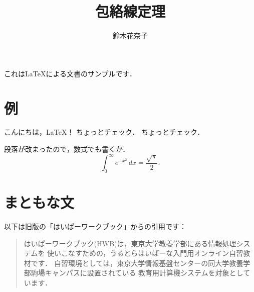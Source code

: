 \documentclass[b5paper]{jsarticle}
\title{包絡線定理}
\author{鈴木花奈子}
\begin{document}
\maketitle
これは\LaTeX による文書のサンプルです．

\section{例}
こんにちは，\LaTeX！
ちょっとチェック．
ちょ{}っとチェ{}ック．

段落が改まったので，数式でも書くか．
\[
  \int_0^{\infty} e^{-x^2}\,dx=\frac{\sqrt{\pi}}{2}.
\]

\section{まともな文}
以下は旧版の「はいぱーワークブック」からの引用です：
\begin{quote}
  はいぱーワークブック(HWB)は，東京大学教養学部にある情報処理システムを
  使いこなすための，うるとらはいぱーな入門用オンライン自習教材です．
  自習環境としては，東京大学情報基盤センターの同大学教養学部駒場キャンパスに設置されている
  教育用計算機システムを対象としています．
\end{quote}
\end{document}
